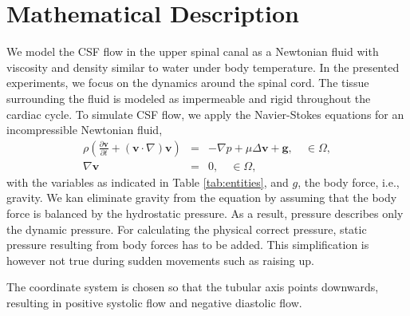\section{Mathematical Description}

We model the CSF flow in the upper spinal canal as a Newtonian fluid
 with viscosity and density similar to water
under body temperature. In the presented experiments, we focus on the
dynamics around the spinal cord. The tissue surrounding the fluid is
modeled as impermeable and rigid throughout the cardiac cycle. To
simulate CSF flow, we apply the Navier-Stokes 
equations for an incompressible Newtonian fluid,
\begin{eqnarray*}
\rho \left(\frac{\partial \mathbf{v}}{\partial t} + (\mathbf{v}\cdot\nabla) \mathbf{v}\right) &=& -\nabla p + \mu \Delta \mathbf{v} + \mathbf{g}, \quad \in \Omega, \\ 
\nabla \mathbf{v} &=& 0, \quad \in \Omega, 
\end{eqnarray*}
with the variables as indicated in Table \ref{tab:entities}, and $g$,
the body force, i.e., gravity. We kan eliminate gravity from the
equation by assuming that the body force is balanced by the
hydrostatic pressure. As a result, pressure describes only the dynamic
pressure. For calculating the physical correct pressure, static
pressure resulting from body forces has to be added. This
simplification is however not true during sudden movements such as
raising up.

The coordinate system is chosen so that the tubular axis points downwards, resulting in  positive systolic flow and negative diastolic flow.  

